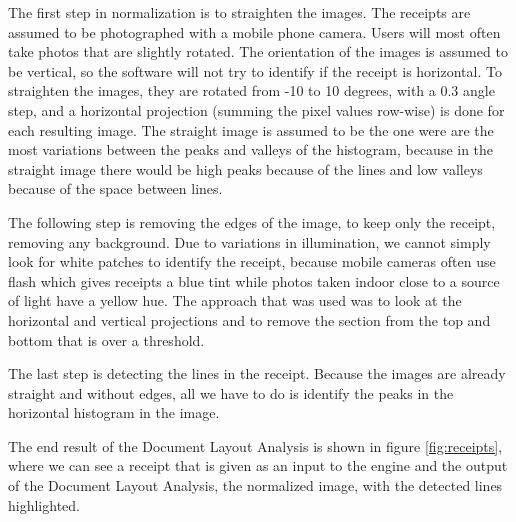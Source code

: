 The first step in normalization is to straighten the images. The receipts are assumed to be photographed with a mobile phone camera. Users will most often take photos that are slightly rotated. The orientation of the images is assumed to be vertical, so the software will not try to identify if the receipt is horizontal. To straighten the images, they are rotated from -10 to 10 degrees, with a 0.3 angle step, and a horizontal projection (summing the pixel values row-wise) is done for each resulting image. The straight image is assumed to be the one were are the most variations between the peaks and valleys of the histogram, because in the straight image there would be high peaks because of the lines and low valleys because of the space between lines. 

The following step is removing the edges of the image, to keep only the receipt, removing any background. Due to variations in illumination, we cannot simply look for white patches to identify the receipt, because mobile cameras often use flash which gives receipts a blue tint while photos taken indoor close to a source of light have a yellow hue. The approach that was used was to look at the horizontal and vertical projections and to remove the section from the top and bottom that is over a threshold. 

The last step is detecting the lines in the receipt. Because the images are already straight and without edges, all we have to do is identify the peaks in the horizontal histogram in the image.  

The end result of the Document Layout Analysis is shown in figure \ref{fig:receipts}, where we can see a receipt that is given as an input to the engine and the output of the Document Layout Analysis, the normalized image, with the detected lines highlighted.


